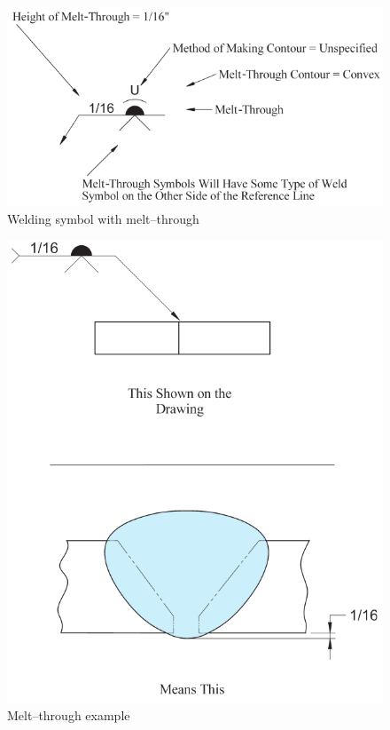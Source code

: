 \begin{figure}[H]
\centering
\includegraphics{PIC/CH07/EXAMPLE/MT}
\caption{Welding symbol with melt--through \citep{Corgan2017}}
\end{figure}
\begin{figure}[H]
\centering
\includegraphics{PIC/CH07/EXAMPLE/MT2}
\caption{Melt--through example \citep{Corgan2017}}
\end{figure}
